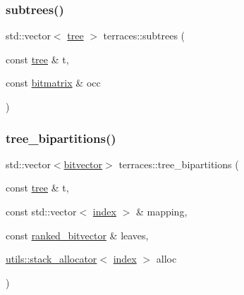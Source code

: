 \subsubsection{\texorpdfstring{subtrees()}{subtrees()}}
{\footnotesize\ttfamily std\+::vector$<$ \hyperlink{namespaceterraces_a07aaf7feec4a22c6cdefc14c5a81bdd0}{tree} $>$ terraces\+::subtrees (\begin{DoxyParamCaption}\item[{const \hyperlink{namespaceterraces_a07aaf7feec4a22c6cdefc14c5a81bdd0}{tree} \&}]{t,  }\item[{const \hyperlink{classterraces_1_1bitmatrix}{bitmatrix} \&}]{occ }\end{DoxyParamCaption})}

\mbox{\label{namespaceterraces_a34db8e988e2845af99b6b228924a5f56}} 
\subsubsection{\texorpdfstring{tree\+\_\+bipartitions()}{tree\_bipartitions()}}
{\footnotesize\ttfamily std\+::vector$<$\hyperlink{namespaceterraces_a1b526fb554dff829f7ad51eb21d5ed06}{bitvector}$>$ terraces\+::tree\+\_\+bipartitions (\begin{DoxyParamCaption}\item[{const \hyperlink{namespaceterraces_a07aaf7feec4a22c6cdefc14c5a81bdd0}{tree} \&}]{t,  }\item[{const std\+::vector$<$ \hyperlink{namespaceterraces_adbc33ccb543d1634e96d0eb02e472c77}{index} $>$ \&}]{mapping,  }\item[{const \hyperlink{namespaceterraces_acc45ec9c561024c50ecbce5b6738ba08}{ranked\+\_\+bitvector} \&}]{leaves,  }\item[{\hyperlink{classterraces_1_1utils_1_1stack__allocator}{utils\+::stack\+\_\+allocator}$<$ \hyperlink{namespaceterraces_adbc33ccb543d1634e96d0eb02e472c77}{index} $>$}]{alloc }\end{DoxyParamCaption})}

